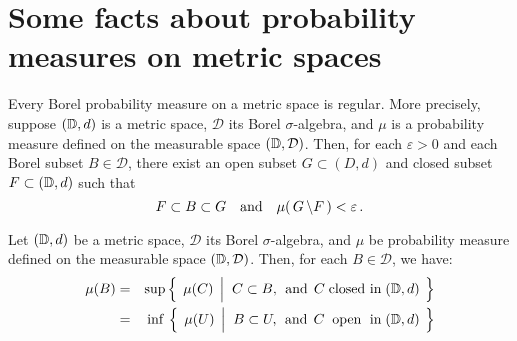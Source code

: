 

\section{Some facts about probability measures on metric spaces}
\setcounter{theorem}{0}
\setcounter{equation}{0}


\renewcommand{\theenumi}{\roman{enumi}}
\renewcommand{\labelenumi}{\textnormal{(\theenumi)}$\;\;$}


\begin{theorem}
\mbox{}\vskip 0.1cm
\noindent
Every Borel probability measure on a metric space is regular.
More precisely, suppose $(\mathbb{D},d)$ is a metric space, $\mathcal{D}$ its Borel $\sigma$-algebra,
and $\mu$ is a probability measure defined on the measurable space $(\mathbb{D},\mathcal{D})$.
Then, for each $\varepsilon > 0$ and each Borel subset $B \in \mathcal{D}$, there exist
an open subset $G \subset (D,d)$ and closed subset $F \subset (\mathbb{D},d)$ such that
\begin{equation*}
F \subset B \subset G
\quad\textnormal{and}\quad
\mu\!\left(\,G \,\backslash F\,\right) < \varepsilon\,.
\end{equation*} 
\end{theorem}


\begin{corollary}
\mbox{}\vskip 0.1cm
\noindent
Let $(\mathbb{D},d)$ be a metric space, $\mathcal{D}$ its Borel $\sigma$-algebra, and
$\mu$ be probability measure defined on the measurable space $(\mathbb{D},\mathcal{D})$.
Then, for each $B \in \mathcal{D}$, we have:
\begin{eqnarray*}
\mu(B)
& = &
	\sup\left\{\;\,\mu(C)\;\left\vert\;\;
		C \overset{{\color{white}.}}{\subset} B,
		\;\,\textnormal{and}\;\,
		C \;\textnormal{closed in}\; (\D,d)
	\right.\;\right\}
\\
& = &
	\,\inf\,\left\{\;\,\mu(U)\;\left\vert\;\;
		B \overset{{\color{white}.}}{\subset} U,
		\;\,\textnormal{and}\;\,
		C \;\textnormal{\;open\; in}\; (\D,d)
	\right.\;\right\}
\end{eqnarray*} 
\end{corollary}

